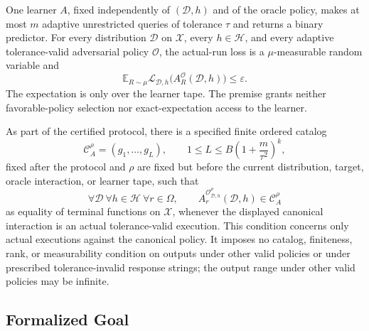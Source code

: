 \begin{assumption}
\label{assump:universal-adversarial-sq}
One learner \(A\), fixed independently of \((\mathcal D,h)\) and of the
oracle policy, makes at most \(m\) adaptive unrestricted queries of tolerance
\(\tau\) and returns a binary predictor.  For every distribution
\(\mathcal D\) on \(\mathcal X\), every \(h\in\mathcal H\), and every
adaptive tolerance-valid adversarial policy \(\mathcal O\), the actual-run
loss is a \(\mu\)-measurable random variable and
\begin{equation}
\mathbb E_{R\sim\mu}
\mathcal L_{\mathcal D,h}
\bigl(A_R^{\mathcal O}(\mathcal D,h)\bigr)
\le\varepsilon.
\label{eq:universal-risk-guarantee}
\end{equation}
The expectation is only over the learner tape.  The premise grants neither
favorable-policy selection nor exact-expectation access to the learner.
\end{assumption}

\begin{assumption}
\label{assump:canonical-rounded-output-catalog}
As part of the certified protocol, there is a specified finite ordered
catalog
\begin{equation}
\mathcal C_A^{\rho}=(g_1,\ldots,g_L),
\qquad
1\le L\le B\left(1+\frac{m}{\tau^2}\right)^k,
\label{eq:catalog-size}
\end{equation}
fixed after the protocol and \(\rho\) are fixed but before the current
distribution, target, oracle interaction, or learner tape, such that
\begin{equation}
\forall\mathcal D\ \forall h\in\mathcal H\ \forall r\in\Omega,
\qquad
A_r^{\mathcal O^{\rho}_{\mathcal D,h}}(\mathcal D,h)
\in\mathcal C_A^{\rho}
\label{eq:catalog-membership-assumption}
\end{equation}
as equality of terminal functions on \(\mathcal X\), whenever the displayed
canonical interaction is an actual tolerance-valid execution.  This
condition concerns only actual executions against the canonical policy.  It
imposes no catalog, finiteness, rank, or measurability condition on outputs
under other valid policies or under prescribed tolerance-invalid response
strings; the output range under other valid policies may be infinite.
\end{assumption}

\subsection{Formalized Goal}

